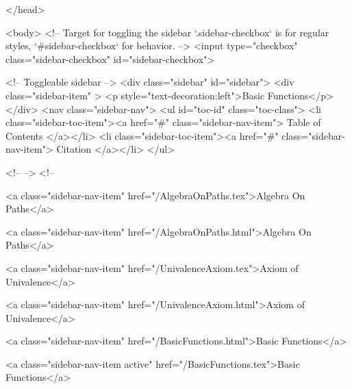   
</head>




  <body>
    <!-- Target for toggling the sidebar `.sidebar-checkbox` is for regular
     styles, `#sidebar-checkbox` for behavior. -->
<input type="checkbox" class="sidebar-checkbox" id="sidebar-checkbox">

<!-- Toggleable sidebar -->
<div class="sidebar" id="sidebar">
  <div class="sidebar-item" >
    <p style="text-decoration:left">Basic Functions</p>
  </div>
  <nav class="sidebar-nav">
    <ul id="toc-id" class="toc-class">
  <li class="sidebar-toc-item"><a href="#" class="sidebar-nav-item"> Table of Contents </a></li>
  <li class="sidebar-toc-item"><a href="#" class="sidebar-nav-item"> Citation </a></li>
</ul>


    <!--  -->
    <!-- 
      
    
      
    
      
    
      
        
      
    
      
        
          <a class="sidebar-nav-item" href="/AlgebraOnPaths.tex">Algebra On Paths</a>
        
      
    
      
        
          <a class="sidebar-nav-item" href="/AlgebraOnPaths.html">Algebra On Paths</a>
        
      
    
      
        
          <a class="sidebar-nav-item" href="/UnivalenceAxiom.tex">Axiom of Univalence</a>
        
      
    
      
        
          <a class="sidebar-nav-item" href="/UnivalenceAxiom.html">Axiom of Univalence</a>
        
      
    
      
        
          <a class="sidebar-nav-item" href="/BasicFunctions.html">Basic Functions</a>
        
      
    
      
        
          <a class="sidebar-nav-item active" href="/BasicFunctions.tex">Basic Functions</a>
        
      
    
      
        
